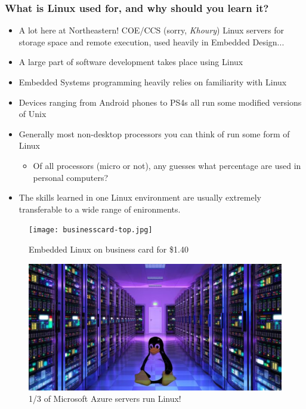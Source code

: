 \documentclass{beamer}
\begin{document}
\begin{frame}
  \frametitle{What is Linux used for, and why should you learn it?}
  \begin{itemize}
    \item A lot here at Northeastern! COE/CCS (sorry, \emph{Khoury}) Linux servers for storage space and remote execution, used heavily in Embedded Design...
    \item A large part of software development takes place using Linux
    \item Embedded Systems programming heavily relies on familiarity with Linux
    \item Devices ranging from Android phones to PS4s all run some modified versions of Unix
    \item Generally most non-desktop processors you can think of run some form of Linux
      \begin{itemize}
        \item Of all processors (micro or not), any guesses what percentage are used in personal computers?
      \end{itemize}
    \item The skills learned in one Linux environment are usually extremely transferable to a wide range of enironments.
  \end{itemize}
\end{frame}

\begin{frame}
  \begin{figure}[ht]
    \texttt{[image: businesscard-top.jpg]}
    \caption{Embedded Linux on business card for \$1.40}
  \end{figure}
\end{frame}

\begin{frame}
  \begin{figure}[ht]
    \includegraphics[width=\textwidth]{tuxserver.jpg}
    \caption{1/3 of Microsoft Azure servers run Linux!}
  \end{figure}
\end{frame}
\end{document}
